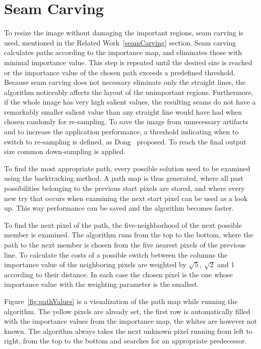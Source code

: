 \documentclass[draft,final]{vutinfth} %
\begin{document}
	\section{Seam Carving}
	To resize the image without damaging the important regions, seam carving is used, mentioned in the Related Work~\ref{seamCarving} section.
	Seam carving calculates paths according to the importance map, and eliminates those with minimal importance value.
	This step is repeated until the desired size is reached or the importance value of the chosen path exceeds a predefined threshold.
	Because seam carving does not necessary eliminate only the straight lines, the algorithm noticeably affects the layout of the unimportant regions.
	Furthermore, if the whole image has very high salient values, the resulting seams do not have a remarkably smaller salient value than any straight line would have had when chosen randomly for re-sampling.
	To save the image from unnecessary artifacts and to increase the application performance, a threshold indicating when to switch to re-sampling is defined, as Dong~\cite{dong2009optimized} proposed.
	To reach the final output size common down-sampling is applied.\par 
	To find the most appropriate path, every possible solution need to be examined using the backtracking method.
	A path map is thus generated, where all past possibilities belonging to the previous start pixels are stored, and where every new try that occurs when examining the next start pixel can be used as a look up.
	This way performance can be saved and the algorithm becomes faster.\par 
	To find the next pixel of the path, the five-neighborhood of the next possible member is examined.
	The algorithm runs from the top to the bottom, where the path to the next member is chosen from the five nearest pixels of the previous line.
	To calculate the costs of a possible switch between the columns the importance value of the neighboring pixels are weighted by $\sqrt{5}$, $\sqrt{2}$ and 1 according to their distance.
	In each case the chosen pixel is the one whose importance value with the weighting parameter is the smallest.\par
	Figure~\ref{fig:pathValues} is a visualization of the path map while running the algorithm.
	The yellow pixels are already set, the first row is automatically filled with the importance values from the importance map, the whites are however not known.
	The algorithm always takes the next unknown pixel running from left to right, from the top to the bottom and searches for an appropriate predecessor.
\end{document}
